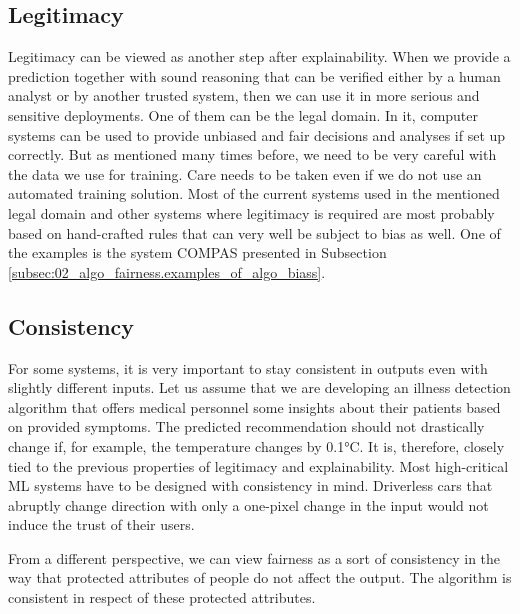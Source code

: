 \subsection*{Legitimacy}
Legitimacy can be viewed as another step after explainability. When we provide a prediction together with sound reasoning that can be verified either by a human analyst or by another trusted system, then we can use it in more serious and sensitive deployments. One of them can be the legal domain. In it, computer systems can be used to provide unbiased and fair decisions and analyses if set up correctly. But as mentioned many times before, we need to be very careful with the data we use for training. Care needs to be taken even if we do not use an automated training solution. Most of the current systems used in the mentioned legal domain and other systems where legitimacy is required are most probably based on hand-crafted rules that can very well be subject to bias as well. One of the examples is the system COMPAS presented in Subsection \ref{subsec:02_algo_fairness.examples_of_algo_biass}.

\subsection*{Consistency}
For some systems, it is very important to stay consistent in outputs even with slightly different inputs. Let us assume that we are developing an illness detection algorithm that offers medical personnel some insights about their patients based on provided symptoms. The predicted recommendation should not drastically change if, for example, the temperature changes by 0.1°C. It is, therefore, closely tied to the previous properties of legitimacy and explainability. Most high-critical ML systems have to be designed with consistency in mind. Driverless cars that abruptly change direction with only a one-pixel change in the input would not induce the trust of their users.

From a different perspective, we can view fairness as a sort of consistency in the way that protected attributes of people do not affect the output. The algorithm is consistent in respect of these protected attributes.


